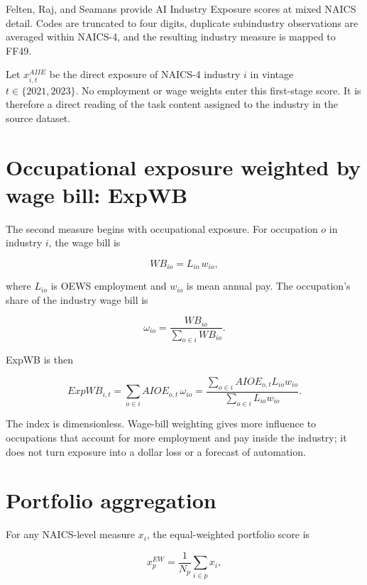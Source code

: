 \documentclass[11pt,a4paper]{article}
\begin{document}
Felten, Raj, and Seamans provide AI Industry Exposure scores at mixed NAICS detail. Codes are truncated to four digits, duplicate subindustry observations are averaged within NAICS-4, and the resulting industry measure is mapped to FF49.

Let $x_{i,t}^{AIIE}$ be the direct exposure of NAICS-4 industry $i$ in vintage $t\in\{2021,2023\}$. No employment or wage weights enter this first-stage score. It is therefore a direct reading of the task content assigned to the industry in the source dataset.

\section{Occupational exposure weighted by wage bill: ExpWB}

The second measure begins with occupational exposure. For occupation $o$ in industry $i$, the wage bill is

\begin{equation}
WB_{io}=L_{io}\,w_{io},
\end{equation}

where $L_{io}$ is OEWS employment and $w_{io}$ is mean annual pay. The occupation's share of the industry wage bill is

\begin{equation}
\omega_{io}=\frac{WB_{io}}{\sum_{o\in i}WB_{io}}.
\end{equation}

ExpWB is then

\begin{equation}
ExpWB_{i,t}=\sum_{o\in i}AIOE_{o,t}\,\omega_{io}
=\frac{\sum_{o\in i}AIOE_{o,t}L_{io}w_{io}}
{\sum_{o\in i}L_{io}w_{io}}.
\end{equation}

The index is dimensionless. Wage-bill weighting gives more influence to occupations that account for more employment and pay inside the industry; it does not turn exposure into a dollar loss or a forecast of automation.

\section{Portfolio aggregation}

For any NAICS-level measure $x_i$, the equal-weighted portfolio score is

\begin{equation}
x_p^{EW}=\frac{1}{N_p}\sum_{i\in p}x_i,
\end{equation}
\end{document}
